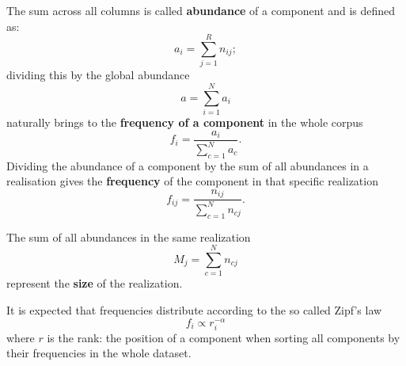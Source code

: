 The sum across all columns is called \textbf{abundance} of a component and is defined as:
\begin{equation}\label{eq:abundance}
a_i=\sum_{j=1}^{R}n_{ij};
\end{equation}
dividing this by the global abundance 
\begin{equation}
  a=\sum_{i=1}^{N}a_i
\end{equation}
naturally brings to the \textbf{frequency of a component} in the whole corpus
\begin{equation}\label{eq:fi}
f_i=\frac{a_i}{\sum_{c=1}^{N}a_{c}}.
\end{equation}
Dividing the abundance of a component by the sum of all abundances in a realisation gives the \textbf{frequency} of the component in that specific realization
\begin{equation}
f_{ij}=\frac{n_{ij}}{\sum_{c=1}^{N}n_{cj}}.
\end{equation}

The sum of all abundances in the same realization
\begin{equation}\label{eq:size}
M_j=\sum_{c=1}^{N}n_{cj}
\end{equation}
represent the \textbf{size} of the realization.

It is expected that frequencies distribute according to the so called Zipf's law
\begin{equation}\label{eq:zipf}
f_i\propto r_i^{-\alpha}
\end{equation}
where $r$ is the rank: the position of a component when sorting all components by their frequencies in the whole dataset.
